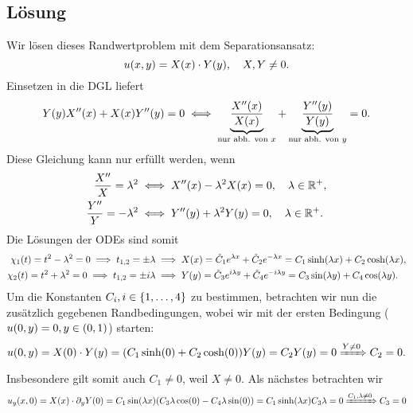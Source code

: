 \documentclass{exercise}
\begin{document}
    \subsection*{Lösung}
    Wir lösen dieses Randwertproblem mit dem Separationsansatz:
    \[
        u\parentheses*{x, y} = X\parentheses*{x} \cdot Y\parentheses*{y}, \quad X, Y \ne 0.
    \]
    Einsetzen in die DGL liefert
    \[
        Y\parentheses*{y}X''\parentheses*{x} + X\parentheses*{x}Y''\parentheses*{y} = 0 \iff \underbrace{\frac{X''\parentheses*{x}}{X\parentheses*{x}}}_{\text{nur abh. von }x} + \underbrace{\frac{Y''\parentheses*{y}}{Y\parentheses*{y}}}_{\text{nur abh. von }y} = 0.
    \]
    Diese Gleichung kann nur erfüllt werden, wenn
    \begin{align*}
        \frac{X''}{X} = \lambda^2 &\iff X''\parentheses*{x} - \lambda^2 X\parentheses*{x} = 0, \quad \lambda \in \R^+,\\
        \frac{Y''}{Y} = -\lambda^2 &\iff Y''\parentheses*{y} + \lambda^2 Y\parentheses*{y} = 0, \quad \lambda \in \R^+.\\
    \end{align*}
    Die Lösungen der ODEs sind somit
    \begin{align*}
        \chi_1\parentheses*{t} = t^2 - \lambda^2 = 0 \implies t_{1, 2} = \pm\lambda &\implies X\parentheses*{x} = \tilde{C}_1 e^{\lambda x} + \tilde{C}_2 e^{-\lambda x} = C_1 \sinh\parentheses*{\lambda x} + C_2 \cosh\parentheses*{\lambda x},\\
        \chi_2\parentheses*{t} = t^2 + \lambda^2 = 0 \implies t_{1, 2} = \pm i\lambda &\implies Y\parentheses*{y} = \tilde{C}_3 e^{i\lambda y} + \tilde{C}_4 e^{-i\lambda y} = C_3 \sin\parentheses*{\lambda y} + C_4 \cos\parentheses*{\lambda y}.
    \end{align*}
    Um die Konstanten \(C_i, i \in \braces*{1, \ldots, 4}\) zu bestimmen, betrachten wir nun die zusätzlich gegebenen Randbedingungen, wobei wir mit der ersten Bedingung (\(u\parentheses*{0, y} = 0, y \in \parentheses*{0, 1}\)) starten:
    \[
        u\parentheses*{0, y} = X\parentheses*{0} \cdot Y\parentheses*{y} = \parentheses*{C_1 \sinh\parentheses*{0} + C_2 \cosh\parentheses*{0}}Y\parentheses*{y} = C_2 Y\parentheses*{y} = 0 \xRightarrow{Y \ne 0} C_2 = 0.
    \]
    Insbesondere gilt somit auch \(C_1 \ne 0\), weil \(X \ne 0\).
    Als nächstes betrachten wir
    \[
        u_y\parentheses*{x, 0} = X\parentheses*{x} \cdot \partial_y Y\parentheses*{0} = C_1 \sin\parentheses*{\lambda x}\parentheses*{C_3 \lambda\cos\parentheses*{0} - C_4 \lambda\sin\parentheses*{0}} = C_1\sinh\parentheses*{\lambda x}C_3 \lambda = 0 \xRightarrow{C_1, \lambda \ne 0} C_3 = 0
    \]
\end{document}
